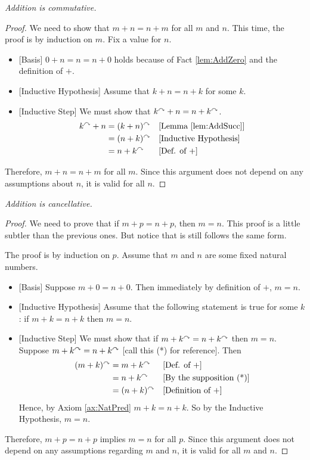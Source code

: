 \ipadbreak

\begin{fact}

  \emph{Addition is commutative.}

\begin{proof}
  We need to show that $m+n = n + m$ for all $m$ and $n$.  This time,
  the proof is by induction on $m$. Fix a value for $n$.
  \begin{itemize}
  \item{}[Basis] $0 + n = n = n + 0$ holds because of Fact
    \ref{lem:AddZero} and the definition of $+$.
  \item{}[Inductive Hypothesis] Assume that $k + n = n + k$ for some
    $k$.
  \item{}[Inductive Step] We must show that $k^\curvearrowright + n = n + k^\curvearrowright$.
    \begin{align*}
      k^\curvearrowright + n &= (k + n)^\curvearrowright&&\text{[Lemma \ref{lem:AddSucc}]}\\
      &=  (n+k)^\curvearrowright&&\text{[Inductive Hypothesis]}\\
      &= n + k^\curvearrowright&&\text{[Def. of $+$]}
    \end{align*}
  \end{itemize}
  Therefore, $m + n = n + m$ for all $m$. Since this argument does not
  depend on any assumptions about $n$, it is valid for all $n$.
\end{proof}
\end{fact}
\ipadbreak

\begin{fact}
  \emph{Addition is cancellative.}

\begin{proof}
  We need to prove that if $m + p= n+p$, then $m=n$.  This proof is a little subtler than the previous ones. But notice that is
  still follows the same form.
  
  The proof is by induction on $p$. Assume that $m$ and $n$ are some fixed natural numbers.
  \begin{itemize}
  \item{}[Basis] Suppose $m+0 = n+ 0$. Then immediately by definition
    of $+$, $m=n$.
  \item{}[Inductive Hypothesis] Assume that the following statement is true for some $k$: if $m + k = n + k$ then $m=n$.
  \item{}[Inductive Step] We must show that 
    if $m+k^\curvearrowright = n+k^\curvearrowright$ then $m=n$. Suppose $m+k^\curvearrowright = n + k^\curvearrowright$ [call this (*) for reference]. Then
    \begin{align*}
      (m+k)^\curvearrowright & = m + k^\curvearrowright &&\text{[Def. of $+$]}\\
      & = n + k^\curvearrowright &&\text{[By the supposition (*)]}\\
      & = (n+k)^\curvearrowright &&\text{[Definition of $+$]}
    \end{align*}
    Hence, by Axiom \ref{ax:NatPred} $m+k=n+k$. So by the Inductive Hypothesis, $m=n$.
  \end{itemize}
  Therefore, $m + p = n + p$ implies $m = n$ for all $p$. Since this argument does not
depend on any assumptions regarding $m$ and $n$, it is valid for all $m$ and $n$.
\end{proof}
\end{fact}
\ipadbreak

